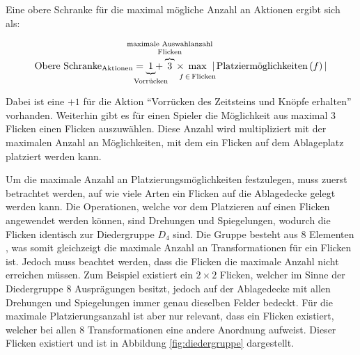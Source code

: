 Eine obere Schranke für die maximal mögliche Anzahl an Aktionen ergibt sich als:

\vspace*{-0.45cm}
\begin{equation}
    \text{Obere Schranke}_{\text{Aktionen}} = \:
    \underset{\mathclap{\substack{\rotatebox[origin=c]{90}{\(\{ \)} \mathstrut \\ \text{Vorrücken}}}}{1}
    + \:
    \overset{\mathclap{\substack{\text{maximale Auswahlanzahl} \mathstrut \\ \text{Flicken} \mathstrut \\ \rotatebox[origin=c]{-90}{\(\{ \)}}}}{3} \:
    \times \:
    \max\limits_{\mathclap{\substack{\phantom{\text{\tiny m}} \\ f\, \in\, \text{Flicken}}}} \:\,
    \left\lvert\, \text{Platziermöglichkeiten}\left( f \right)\, \right\rvert
\end{equation}

Dabei ist eine $+1$ für die Aktion \enquote{Vorrücken des Zeitsteins und Knöpfe erhalten} vorhanden. Weiterhin gibt es für einen Spieler die Möglichkeit aus maximal 3 Flicken einen Flicken auszuwählen. Diese Anzahl wird multipliziert mit der maximalen Anzahl an Möglichkeiten, mit dem ein Flicken auf dem Ablageplatz platziert werden kann.

Um die maximale Anzahl an Platzierungsmöglichkeiten festzulegen, muss zuerst betrachtet werden, auf wie viele Arten ein Flicken auf die Ablagedecke gelegt werden kann. Die Operationen, welche vor dem Platzieren auf einen Flicken angewendet werden können, sind Drehungen und Spiegelungen, wodurch die Flicken identisch zur Diedergruppe $D_4$ sind. Die Gruppe besteht aus 8 Elementen \cite[S. 33]{2015.AbstractAlgebra}, was somit gleichzeigt die maximale Anzahl an Transformationen für ein Flicken ist. Jedoch muss beachtet werden, dass die Flicken die maximale Anzahl nicht erreichen müssen. Zum Beispiel existiert ein $2\times2$ Flicken, welcher im Sinne der Diedergruppe 8 Ausprägungen besitzt, jedoch auf der Ablagedecke mit allen Drehungen und Spiegelungen immer genau dieselben Felder bedeckt. Für die maximale Platzierungsanzahl ist aber nur relevant, dass ein Flicken existiert, welcher bei allen 8 Transformationen eine andere Anordnung aufweist. Dieser Flicken existiert und ist in Abbildung \ref{fig:diedergruppe} dargestellt.

